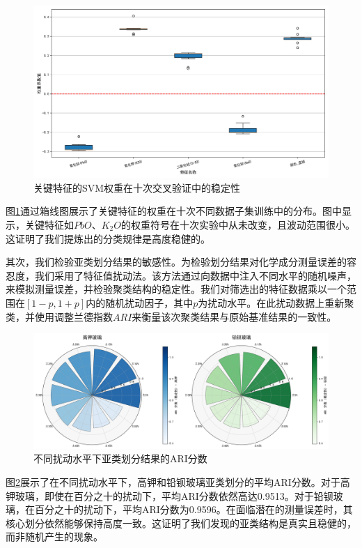 \begin{figure}[H]
    \centering
    \includegraphics[width=\textwidth]{figs/4问题二/SVM权重稳定性分析.png}
    \caption{关键特征的SVM权重在十次交叉验证中的稳定性}
    \label{fig:svm_stability}
\end{figure}

图\ref{fig:svm_stability}通过箱线图展示了关键特征的权重在十次不同数据子集训练中的分布。图中显示，关键特征如$PbO$、$K_2O$的权重符号在十次实验中从未改变，且波动范围很小。这证明了我们提炼出的分类规律是高度稳健的。

其次，我们检验亚类划分结果的敏感性。为检验划分结果对化学成分测量误差的容忍度，我们采用了特征值扰动法。该方法通过向数据中注入不同水平的随机噪声，来模拟测量误差，并检验聚类结构的稳定性。我们对筛选出的特征数据乘以一个范围在$[1-p, 1+p]$内的随机扰动因子，其中$p$为扰动水平。在此扰动数据上重新聚类，并使用调整兰德指数$ARI$来衡量该次聚类结果与原始基准结果的一致性。

\begin{figure}[H]
    \centering
    \includegraphics[width=\textwidth]{figs/4问题二/灵敏度分析_玫瑰图_ARI颜色映射.png}
    \caption{不同扰动水平下亚类划分结果的ARI分数}
    \label{fig:ari_sensitivity}
\end{figure}

图\ref{fig:ari_sensitivity}展示了在不同扰动水平下，高钾和铅钡玻璃亚类划分的平均ARI分数。对于高钾玻璃，即使在百分之十的扰动下，平均ARI分数依然高达0.9513。对于铅钡玻璃，在百分之十的扰动下，平均ARI分数为0.9596。在面临潜在的测量误差时，其核心划分依然能够保持高度一致。这证明了我们发现的亚类结构是真实且稳健的，而非随机产生的现象。


